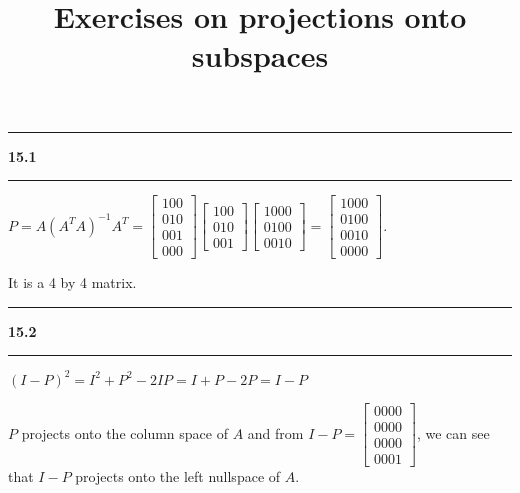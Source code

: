 \documentclass[11pt]{article}
\newcommand\question[2]{\vspace{.25in}\hrule\textbf{#1 #2}\vspace{.5em}\hrule\vspace{.10in}}
\begin{document}
\raggedright
\newcommand\NAME{Haiying Cui}  %
\newcommand\ANDREWID{Christy}     %
\newcommand\HWNUM{15}              %

\title{Exercises on projections onto subspaces}
\maketitle

\question{15.1}{}
\(P = A(A^TA)^{-1}A^T = \begin{bmatrix} 1 0 0 \\ 0 1 0 \\ 0 0 1 \\ 0 0 0 \end{bmatrix}\begin{bmatrix}1 0 0 \\ 0 1 0 \\ 0 0 1 \end{bmatrix}\begin{bmatrix}1 0 0 0 \\ 0 1 0 0 \\ 0 0 1 0 \end{bmatrix} = \begin{bmatrix}1 0 0 0 \\ 0 1 0 0 \\ 0 0 1 0 \\ 0 0 0 0 \end{bmatrix}\).

It is a 4 by 4 matrix.

\question{15.2}{}
\((I - P)^2 = I^2 + P^2 - 2IP = I + P - 2P = I - P\)

\(P\) projects onto the column space of \(A\) and from \(I - P = \begin{bmatrix} 0 0 0 0 \\ 0 0 0 0 \\ 0 0 0 0 \\ 0 0 0 1 \end{bmatrix}\), we can see that \(I - P\) projects onto the left nullspace of \(A\).
\end{document}
